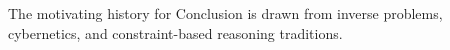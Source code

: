 The motivating history for Conclusion is drawn from inverse problems, cybernetics, and constraint-based reasoning traditions.
